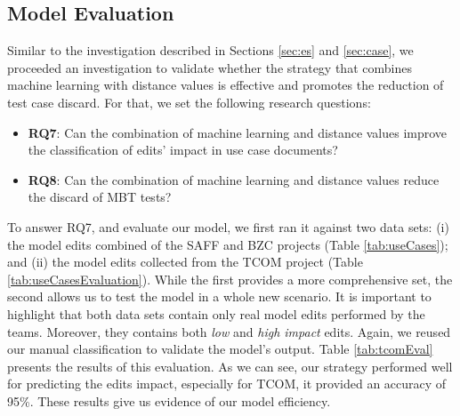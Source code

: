 \subsection{Model Evaluation}

Similar to the investigation described in Sections \ref{sec:es} and \ref{sec:case}, we proceeded an investigation to validate whether the strategy that combines machine learning with distance values is effective and promotes the reduction of test case discard. For that, we set the following research questions:
\begin{itemize}
\item \textbf{RQ7}: Can the combination of machine learning and distance values improve the classification of edits' impact in use case documents?

\item \textbf{RQ8}: Can the combination of machine learning and distance values reduce the discard of MBT tests?


\end{itemize}

To answer RQ7, and evaluate our model, we first ran it against two data sets: (i) the model edits combined of the SAFF and BZC projects (Table \ref{tab:useCases}); and (ii) the model edits collected from the TCOM project (Table \ref{tab:useCasesEvaluation}). While the first provides a more comprehensive set, the second allows us to test the model in a whole new scenario. It is important to highlight that both data sets contain only real model edits performed by the teams. Moreover, they contains both \textit{low} and \textit{high impact} edits. Again, we reused our manual classification to validate the model's output. Table \ref{tab:tcomEval} presents the results of this evaluation. As we can see, our strategy performed well for predicting the edits impact, especially for TCOM, it provided an accuracy of 95\%. These results give us evidence of our model efficiency.
\\ 
\\
\noindent
\vspace{2mm} %
\vspace{2mm}

